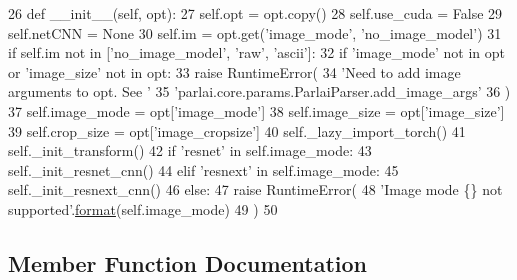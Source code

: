 \begin{DoxyCode}
26     \textcolor{keyword}{def }\_\_init\_\_(self, opt):
27         self.opt = opt.copy()
28         self.use\_cuda = \textcolor{keyword}{False}
29         self.netCNN = \textcolor{keywordtype}{None}
30         self.im = opt.get(\textcolor{stringliteral}{'image\_mode'}, \textcolor{stringliteral}{'no\_image\_model'})
31         \textcolor{keywordflow}{if} self.im \textcolor{keywordflow}{not} \textcolor{keywordflow}{in} [\textcolor{stringliteral}{'no\_image\_model'}, \textcolor{stringliteral}{'raw'}, \textcolor{stringliteral}{'ascii'}]:
32             \textcolor{keywordflow}{if} \textcolor{stringliteral}{'image\_mode'} \textcolor{keywordflow}{not} \textcolor{keywordflow}{in} opt \textcolor{keywordflow}{or} \textcolor{stringliteral}{'image\_size'} \textcolor{keywordflow}{not} \textcolor{keywordflow}{in} opt:
33                 \textcolor{keywordflow}{raise} RuntimeError(
34                     \textcolor{stringliteral}{'Need to add image arguments to opt. See '}
35                     \textcolor{stringliteral}{'parlai.core.params.ParlaiParser.add\_image\_args'}
36                 )
37             self.image\_mode = opt[\textcolor{stringliteral}{'image\_mode'}]
38             self.image\_size = opt[\textcolor{stringliteral}{'image\_size'}]
39             self.crop\_size = opt[\textcolor{stringliteral}{'image\_cropsize'}]
40             self.\_lazy\_import\_torch()
41             self.\_init\_transform()
42             \textcolor{keywordflow}{if} \textcolor{stringliteral}{'resnet'} \textcolor{keywordflow}{in} self.image\_mode:
43                 self.\_init\_resnet\_cnn()
44             \textcolor{keywordflow}{elif} \textcolor{stringliteral}{'resnext'} \textcolor{keywordflow}{in} self.image\_mode:
45                 self.\_init\_resnext\_cnn()
46             \textcolor{keywordflow}{else}:
47                 \textcolor{keywordflow}{raise} RuntimeError(
48                     \textcolor{stringliteral}{'Image mode \{\} not supported'}.\hyperlink{namespaceparlai_1_1chat__service_1_1services_1_1messenger_1_1shared__utils_a32e2e2022b824fbaf80c747160b52a76}{format}(self.image\_mode)
49                 )
50 
\end{DoxyCode}


\subsection{Member Function Documentation}
\mbox{\label{classparlai_1_1core_1_1image__featurizers_1_1ImageLoader_a27aff033d71150a78d7e1bd682990258}} 
